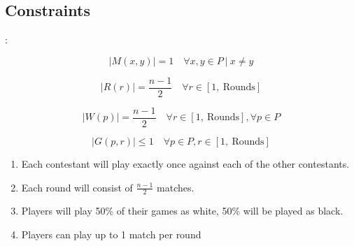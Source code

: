 \documentclass[9pt, aspectratio=169, xcolor=table]{beamer}
\begin{document}
\subsection{Constraints}
\begin{frame}{\secname: \subsecname}
    \begin{minipage}{0.49\textwidth}
	\begin{equation}
	    \label{playwitheachother}
	    |M(x,y)| = 1 \quad \forall x,y \in P \ | \  x \neq y
	\end{equation}

	\begin{equation}
	    \label{matchesperround}
	    |R(r)| = \frac{n-1}{2}  \quad \forall r \in [1,\ \text{Rounds}] 
	\end{equation}

	\begin{equation}
	    \label{fairness}
	    |W(p)| = \frac{n-1}{2} \quad \forall r \in [1, \ \text{Rounds}], \forall p \in P
	\end{equation}

	\begin{equation}
	    \label{1gameperround}
	    |G(p,r)| \leq 1 \quad \forall p \in P, r \in [1, \ \text{Rounds}] 
	\end{equation}


    \end{minipage}
    \hfill
    \begin{minipage}{0.49\textwidth}
	\begin{enumerate}
	    \item Each contestant will play exactly once against each of the other contestants.
	    \item Each round will consist of $\frac{n-1}{2}$ matches.
	    \item Players will play 50\% of their games as white, 50\% will be played as black.
	    \item Players can play up to 1 match per round
	\end{enumerate}
    \end{minipage}

\end{frame}
\end{document}
